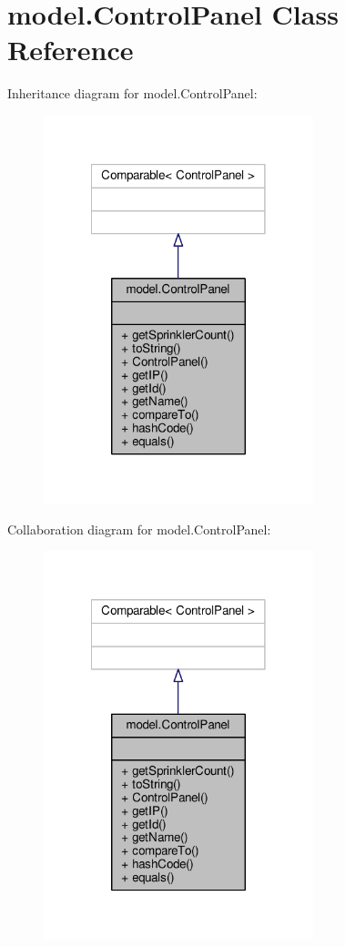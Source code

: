 \hypertarget{classmodel_1_1ControlPanel}{\section{model.\-Control\-Panel Class Reference}
\label{classmodel_1_1ControlPanel}
}


Inheritance diagram for model.\-Control\-Panel\-:\nopagebreak
\begin{figure}[H]
\begin{center}
\leavevmode
\includegraphics[width=222pt]{classmodel_1_1ControlPanel__inherit__graph}
\end{center}
\end{figure}


Collaboration diagram for model.\-Control\-Panel\-:\nopagebreak
\begin{figure}[H]
\begin{center}
\leavevmode
\includegraphics[width=222pt]{classmodel_1_1ControlPanel__coll__graph}
\end{center}
\end{figure}

